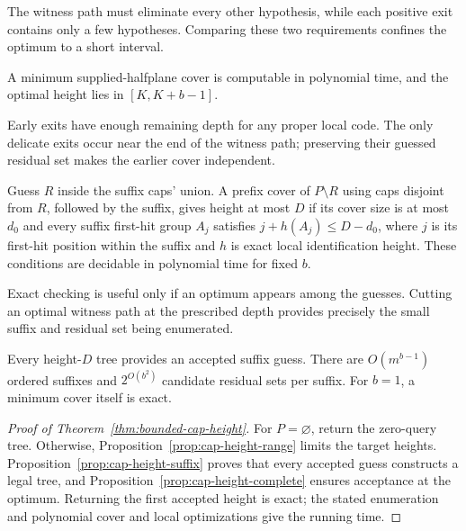 The witness path must eliminate every other hypothesis, while each
positive exit contains only a few hypotheses. Comparing these two
requirements confines the optimum to a short interval.

\begin{proposition}
\label{prop:cap-height-range}
A minimum supplied-halfplane cover is computable in polynomial time,
and the optimal height lies in $[K,K+b-1]$.
\end{proposition}

Early exits have enough remaining depth for any proper local code.
The only delicate exits occur near the end of the witness path;
preserving their guessed residual set makes the earlier cover independent.

\begin{proposition}
\label{prop:cap-height-suffix}
Guess $R$ inside the suffix caps' union. A prefix cover of
$P\setminus R$ using caps disjoint from $R$, followed by the suffix,
gives height at most $D$ if its cover size is at most $d_0$ and every
suffix first-hit group $A_j$ satisfies
$j+h(A_j)\le D-d_0$, where $j$ is its first-hit position within the
suffix and $h$ is exact local identification height.
These conditions are decidable in polynomial time for fixed $b$.
\end{proposition}

Exact checking is useful only if an optimum appears among the guesses.
Cutting an optimal witness path at the prescribed depth provides
precisely the small suffix and residual set being enumerated.

\begin{proposition}
\label{prop:cap-height-complete}
Every height-$D$ tree provides an accepted suffix guess. There are
$O(m^{b-1})$ ordered suffixes and $2^{O(b^2)}$ candidate residual
sets per suffix. For $b=1$, a minimum cover itself is exact.
\end{proposition}



\begin{proof}[Proof of Theorem~\ref{thm:bounded-cap-height}]
For $P=\varnothing$, return the zero-query tree. Otherwise,
Proposition~\ref{prop:cap-height-range} limits the target heights.
Proposition~\ref{prop:cap-height-suffix} proves that every accepted
guess constructs a legal tree, and
Proposition~\ref{prop:cap-height-complete} ensures acceptance at the
optimum. Returning the first accepted height is exact; the stated
enumeration and polynomial cover and local optimizations give the
running time.
\end{proof}

